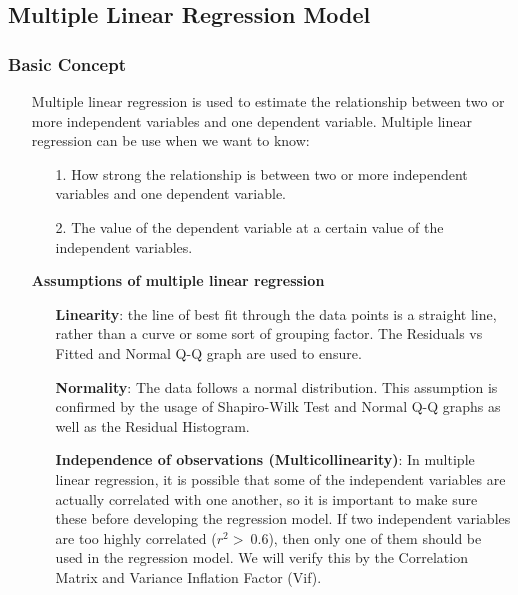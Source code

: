 \documentclass[a4paper]{article}
\begin{document}
\subsection{Multiple Linear Regression Model}
\subsubsection{Basic Concept}
\begin{itemize}
    
    \item [] Multiple linear regression is used to estimate the relationship between two or more independent variables and one dependent variable. Multiple linear regression can be use when we want to know:
    \begin{itemize}
        \item[1.] How strong the relationship is between two or more independent variables and one dependent variable.
        
        \item[2.] The value of the dependent variable at a certain value of the independent variables.
    \end{itemize}
    
    \item[] \textbf{Assumptions of multiple linear regression}
    \begin{itemize}
        \item[] \textbf{Linearity}: the line of best fit through the data points is a straight line, rather than a curve or some sort of grouping factor. The Residuals vs Fitted and Normal Q-Q graph are used to ensure.
        
        \item[] \textbf{Normality}: The data follows a normal distribution. This assumption is confirmed by the usage of Shapiro-Wilk Test and Normal Q-Q graphs as well as the Residual Histogram.
        
        \item[] \textbf{Independence of observations (Multicollinearity)}: In multiple linear regression, it is possible that some of the independent variables are actually correlated with one another, so it is important to make sure these before developing the regression model. If two independent variables are too highly correlated ($r^{2} > ~0.6$), then only one of them should be used in the regression model. We will verify this by the Correlation Matrix and Variance Inflation Factor (Vif). 
        

\end{itemize}
\end{itemize}
\end{document}
